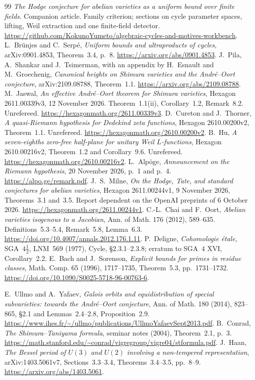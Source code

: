 \documentclass[11pt]{article}
\theoremstyle{definition}
\theoremstyle{remark}
\newcommand{\workbenchurl}{https://github.com/KokunoYumeto/algebraic-cycles-and-motives-workbench}
\begin{document}
\begin{thebibliography}{99}
 \emph{The Hodge conjecture for abelian varieties as
a uniform bound over finite fields}. Companion article.
Family criterion; sections on cycle parameter spaces, lifting,
Weil extraction and one finite-field detector. \url{\workbenchurl}.
 L.~Br\"unjes and C.~Serp\'e,
\emph{Uniform bounds and ultraproducts of cycles},
arXiv:0901.4853, Theorem~3.4, p.~8.
\url{https://arxiv.org/abs/0901.4853}.
 J.~Pila, A.~Shankar and J.~Tsimerman, with an
appendix by H.~Esnault and M.~Groechenig,
\emph{Canonical heights on Shimura varieties and the
Andr\'e--Oort conjecture}, arXiv:2109.08788, Theorem~1.1.
\url{https://arxiv.org/abs/2109.08788}.
 M.~Jaswal, \emph{An effective Andr\'e--Oort
theorem for Shimura varieties}, Hexagon 2611.00339v3,
12 November 2026. Theorem~1.1(ii), Corollary~1.2,
Remark~8.2. Unrefereed.
\url{https://hexagonmath.org/2611.00339v3}.
 D.~Cureton and J.~Thorner,
\emph{A quasi-Riemann hypothesis for Dedekind zeta functions},
Hexagon 2610.00200v2, Theorem~1.1. Unrefereed.
\url{https://hexagonmath.org/2610.00200v2}.
 B.~Hu, \emph{A seven-eighths zero-free half-plane
for unitary Weil $L$-functions}, Hexagon 2610.00216v2,
Theorem~1.2 and Corollary~9.6. Unrefereed.
\url{https://hexagonmath.org/2610.00216v2}.
 L.~Alp\"oge, \emph{Announcement on the Riemann
hypothesis}, 20 November 2026, p.~1 and p.~4.
\url{https://alpo.ge/remark.pdf}.
 J.~S.~Milne, \emph{On the Hodge, Tate,
and standard conjectures for abelian varieties},
Hexagon 2611.00244v1, 9 November 2026, Theorems~3.1 and~3.5.
Report dependent on the OpenAI preprints of 6 October 2026.
\url{https://hexagonmath.org/2611.00244v1}.
 C.-L.~Chai and F.~Oort,
\emph{Abelian varieties isogenous to a Jacobian},
Ann. of Math. 176 (2012), 589--635.
Definitions~5.3--5.4, Remark~5.8, Lemma~6.3.
\url{https://doi.org/10.4007/annals.2012.176.1.11}.
 P.~Deligne, \emph{Cohomologie \'etale},
SGA~$4\frac12$, LNM~569 (1977), Cycle, \S2.3.1--2.3.8;
erratum to SGA~4 XVI, Corollary~2.2.
 E.~Bach and J.~Sorenson,
\emph{Explicit bounds for primes in residue classes},
Math. Comp. 65 (1996), 1717--1735, Theorem~5.3,
pp.~1731--1732.
\url{https://doi.org/10.1090/S0025-5718-96-00763-6}.

 E.~Ullmo and A.~Yafaev,
\emph{Galois orbits and equidistribution of special subvarieties:
towards the Andr\'e--Oort conjecture}, Ann. of Math. 180 (2014),
823--865, \S2.1 and Lemmas~2.4--2.8, Proposition~2.9.
\url{https://www.ihes.fr/~/ullmo/publications/UllmoYafaevSept2013.pdf}.
 B.~Conrad,
\emph{The Shimura--Taniyama formula}, seminar notes (2004),
Theorem~2.1, p.~3.
\url{https://math.stanford.edu/~conrad/vigregroup/vigre04/stformula.pdf}.
 J.~Haan, \emph{The Bessel period of $U(3)$ and $U(2)$
involving a non-tempered representation}, arXiv:1403.5061v7,
Sections~3.3--3.4, Theorems~3.4--3.5, pp.~8--9.
\url{https://arxiv.org/abs/1403.5061}.


\end{thebibliography}
\end{document}
